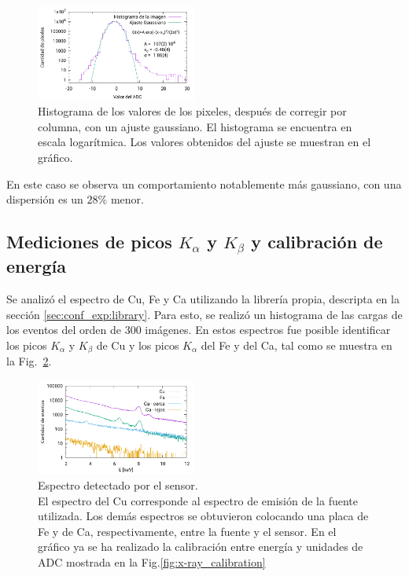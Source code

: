 \documentclass[twoside,twocolumn]{article}
\begin{document}
      \begin{figure}[h]
        \includegraphics[width=0.47\textwidth]{figures/background_histo_subs.pdf}
        \caption{Histograma de los valores de los pixeles, después de corregir por columna, con un ajuste gaussiano.
        El histograma se encuentra en escala logarítmica.
        Los valores obtenidos del ajuste se muestran en el gráfico.}
        \label{fig:histogram_subs} %
      \end{figure}

      En este caso se observa un comportamiento notablemente más gaussiano, con una dispersión es un $28\%$ menor.

    \subsection{Mediciones de picos $K_{\alpha}$ y $K_{\beta}$ y calibración de energía}\label{sec:results:peaks}
      Se analizó el espectro de Cu, Fe y Ca utilizando la librería propia, descripta en la sección \ref{sec:conf_exp:library}.
      Para esto, se realizó un histograma de las cargas de los eventos del orden de 300 imágenes.
      En estos espectros fue posible identificar los picos $K_{\alpha}$ y $K_{\beta}$ de Cu y los picos $K_{\alpha}$ del Fe y del Ca,
      tal como se muestra en la Fig.~\ref{fig:spectrum_x-ray}.

      \begin{figure}[h]
        \includegraphics[width=0.47\textwidth]{figures/x-ray_spectrum.pdf}
        \caption{Espectro detectado por el sensor. \\
          El espectro del Cu corresponde al espectro de emisión de la fuente utilizada.
          Los demás espectros se obtuvieron colocando una placa de Fe y de Ca, respectivamente,
          entre la fuente y el sensor.
          En el gráfico ya se ha realizado la calibración entre energía y unidades de ADC mostrada en la Fig.\ref{fig:x-ray_calibration}}
        \label{fig:spectrum_x-ray}
      \end{figure}
\end{document}
